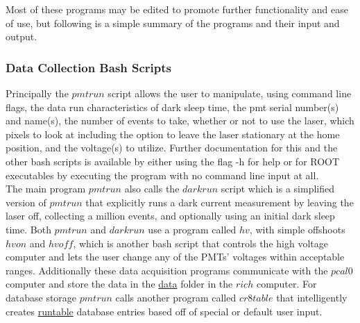 \documentclass[prc,twocolumn]{revtex4}
\begin{document}
		\indent Most of these programs may be edited to promote further functionality and ease of use, but following is a simple summary of the programs and their input and output.

		\subsubsection*{Data Collection Bash Scripts}  		
		\indent Principally the $pmtrun$ script allows the user to manipulate, using command line flags, the data run characteristics of dark sleep time, the pmt serial number(s) and name(s), the number of events to take, whether or not to use the laser, which pixels to look at including the option to leave the laser stationary at the home position, and the voltage(s) to utilize.  Further documentation for this and the other bash scripts is available by either using the flag -h for help or for ROOT executables by executing the program with no command line input at all. 
		\\
		\indent The main program $pmtrun$ also calls the $darkrun$ script which is a simplified version of $pmtrun$ that explicitly runs a dark current measurement by leaving the laser off, collecting a million events, and optionally using an initial dark sleep time. Both $pmtrun$ and $darkrun$ use a program called $hv$, with simple offshoots $hvon$ and $hvoff$, which is another bash script that controls the high voltage computer and lets the user change any of the PMTs' voltages within acceptable ranges. Additionally these data acquisition programs communicate with the $pcal0$ computer and store the data in the \underline{data} folder in the $rich$ computer.  For database storage $pmtrun$ calls another program called $cr8table$ that intelligently creates \underline{runtable} database entries based off of special or default user input. 
		
\end{document}
